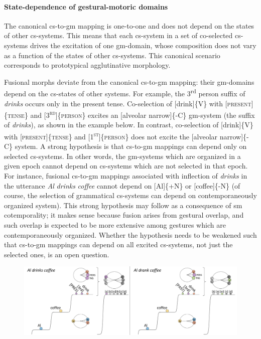 \paragraph{State-dependence of gestural-motoric domains}

The canonical cs-to-gm mapping is one-to-one and does not depend on the states of other cs-systems. This means that each cs-system in a set of co-selected cs-systems drives the excitation of one gm-domain, whose composition does not vary as a function of the states of other cs-systems. This canonical scenario corresponds to prototypical agglutinative morphology. 

  Fusional morphs deviate from the canonical cs-to-gm mapping: their gm-domains depend on the cs-states of other systems. For example, the 3\textsuperscript{rd} person suffix of \textit{drinks} occurs only in the present tense. Co-selection of [drink]\{V\} with [\textsc{present}]\{\textsc{tense}\} and [\textsc{3}\textsc{\textsuperscript{rd}}]\{\textsc{person}\} excites an [alveolar narrow]\{-C\} gm-system (the suffix of \textit{drinks}), as shown in the example below. In contrast, co-selection of [drink]\{V\} with [\textsc{present]}\{\textsc{tense}\} and [\textsc{1}\textsc{\textsuperscript{st}}]\{\textsc{person}\} does not excite the [alveolar narrow]\{-C\} system. A strong hypothesis is that cs-to-gm mappings can depend only on selected cs-systems. In other words, the gm-systems which are organized in a given epoch cannot depend on cs-systems which are not selected in that epoch. For instance, fusional cs-to-gm mappings associated with inflection of \textit{drinks} in the utterance \textit{Al} \textit{drinks} \textit{coffee} cannot depend on [Al]\{+N\} or [coffee]\{-N\} (of course, the selection of grammatical cs-systems can depend on contemporaneously organized system). This strong hypothesis may follow as a consequence of sm cotemporality; it makes sense because fusion arises from gestural overlap, and such overlap is expected to be more extensive among gestures which are contemporaneously organized. Whether the hypothesis needs to be weakened such that cs-to-gm mappings can depend on all excited cs-systems, not just the selected ones, is an open question.

  
\begin{figure}
\includegraphics[width=\textwidth]{figures/Tilsen-img69.png}
\caption{\missingcaption}
\label{fig:}
\end{figure}
 

